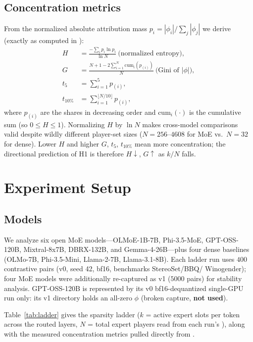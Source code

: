 \documentclass[sigconf]{acmart}
\begin{document}
\subsection{Concentration metrics}
From the normalized absolute attribution mass
$p_i = |\phi_i| / \allowbreak \sum_j |\phi_j|$ we derive (exactly as computed in
):
\begin{align}
 H &= \frac{-\sum_i p_i \ln p_i}{\ln N}
      \ \text{(normalized entropy)},\\
 G &= \frac{N+1 - 2 \sum_{i=1}^{N} \mathrm{cum}_i(p_{(i)})}{N}
      \ \text{(Gini of } |\phi| \text{)},\\
  t_5 &= \sum_{i=1}^{5} p_{(i)},\\
  t_{10\%} &= \sum_{i=1}^{\lfloor N/10 \rfloor} p_{(i)} ,
\end{align}
where $p_{(i)}$ are the shares in decreasing order and
$\mathrm{cum}_i(\cdot)$ is the cumulative sum (so $0 \le H \le 1$).
Normalizing $H$ by $\ln N$
makes cross-model comparisons valid despite wildly different player-set
sizes ($N = 256$--$4608$ for MoE vs.\ $N = 32$ for dense). Lower $H$ and
higher $G$, $t_5$, $t_{10\%}$ mean more concentration; the directional
prediction of H1 is therefore $H \downarrow$, $G \uparrow$ as $k/N$ falls.

\section{Experiment Setup}
\label{sec:setup}
\subsection{Models}
We analyze six open MoE models---OLMoE-1B-7B, Phi-3.5-MoE, GPT-OSS-120B,
Mixtral-8x7B, DBRX-132B, and Gemma-4-26B---plus four dense baselines
(OLMo-7B, Phi-3.5-Mini, Llama-2-7B, Llama-3.1-8B). Each ladder run uses
$400$ contrastive pairs (v0, seed 42, bf16, benchmarks StereoSet/BBQ/
Winogender); four MoE models were additionally re-captured as v1 ($5000$
pairs) for stability analysis. GPT-OSS-120B is represented by its v0
bf16-dequantized single-GPU run only: its v1 directory holds an all-zero
$\phi$ (broken capture, \textbf{not used}).

Table~\ref{tab:ladder} gives the sparsity ladder ($k$ = active expert slots
per token across the routed layers, $N$ = total expert players read from
each run's ), along with the
measured concentration metrics pulled directly from
.
\end{document}
